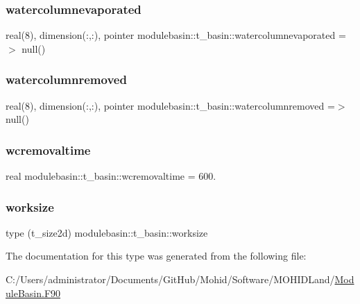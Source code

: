 \subsubsection{\texorpdfstring{watercolumnevaporated}{watercolumnevaporated}}
{\footnotesize\ttfamily real(8), dimension(\+:,\+:), pointer modulebasin\+::t\+\_\+basin\+::watercolumnevaporated =$>$ null()\hspace{0.3cm}{\ttfamily [private]}}

\mbox{\label{structmodulebasin_1_1t__basin_a05871c7b9a1a6c1585b6a8b7613012f3}} 
\subsubsection{\texorpdfstring{watercolumnremoved}{watercolumnremoved}}
{\footnotesize\ttfamily real(8), dimension(\+:,\+:), pointer modulebasin\+::t\+\_\+basin\+::watercolumnremoved =$>$ null()\hspace{0.3cm}{\ttfamily [private]}}

\mbox{\label{structmodulebasin_1_1t__basin_a3e215249267cf3921366c2fb37d8e42a}} 
\subsubsection{\texorpdfstring{wcremovaltime}{wcremovaltime}}
{\footnotesize\ttfamily real modulebasin\+::t\+\_\+basin\+::wcremovaltime = 600.\hspace{0.3cm}{\ttfamily [private]}}

\mbox{\label{structmodulebasin_1_1t__basin_a3d42f442922567fce0f085f375fd8bb2}} 
\subsubsection{\texorpdfstring{worksize}{worksize}}
{\footnotesize\ttfamily type (t\+\_\+size2d) modulebasin\+::t\+\_\+basin\+::worksize\hspace{0.3cm}{\ttfamily [private]}}



The documentation for this type was generated from the following file\+:\begin{DoxyCompactItemize}
\item 
C\+:/\+Users/administrator/\+Documents/\+Git\+Hub/\+Mohid/\+Software/\+M\+O\+H\+I\+D\+Land/\mbox{\hyperlink{_module_basin_8_f90}{Module\+Basin.\+F90}}\end{DoxyCompactItemize}
